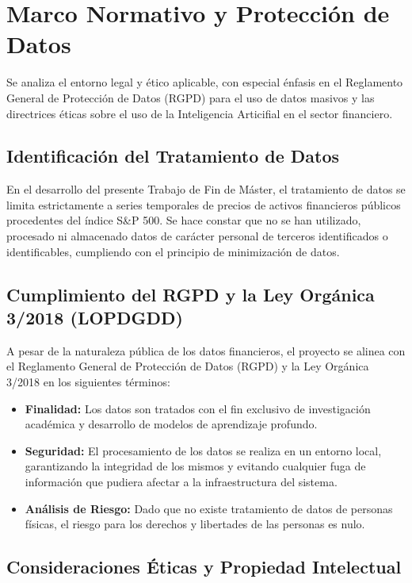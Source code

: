 \chapter{Marco Normativo y Protección de Datos}

Se analiza el entorno legal y ético aplicable, con especial énfasis en el Reglamento General de Protección de Datos (RGPD) para el uso de datos masivos y las directrices éticas sobre el uso de la Inteligencia Articifial en el sector financiero.

\section{Identificación del Tratamiento de Datos}

En el desarrollo del presente Trabajo de Fin de Máster, el tratamiento de datos se limita estrictamente a series temporales de precios de activos financieros públicos procedentes del índice S\&P 500. Se hace constar que no se han utilizado, procesado ni almacenado datos de carácter personal de terceros identificados o identificables, cumpliendo con el principio de minimización de datos.

\section{Cumplimiento del RGPD y la Ley Orgánica 3/2018 (LOPDGDD)}

A pesar de la naturaleza pública de los datos financieros, el proyecto se alinea con el Reglamento General de Protección de Datos (RGPD) y la Ley Orgánica 3/2018 en los siguientes términos:

\begin{itemize}
    \item \textbf{Finalidad:} Los datos son tratados con el fin exclusivo de investigación académica y desarrollo de modelos de aprendizaje profundo.
    \item \textbf{Seguridad:} El procesamiento de los datos se realiza en un entorno local, garantizando la integridad de los mismos y evitando cualquier fuga de información que pudiera afectar a la infraestructura del sistema.
    \item \textbf{Análisis de Riesgo:} Dado que no existe tratamiento de datos de personas físicas, el riesgo para los derechos y libertades de las personas es nulo.
\end{itemize}

\section{Consideraciones Éticas y Propiedad Intelectual}

